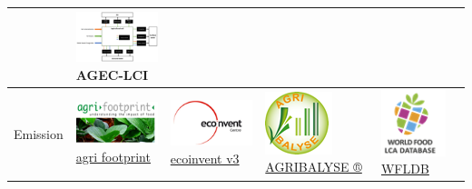 \documentclass[openany]{book}
\begin{document}
\begin{longtable}[]{@{}llllll@{}}
\begin{minipage}[b]{0.12\columnwidth}
\end{minipage} & \begin{minipage}[b]{0.17\columnwidth}\raggedright
\includegraphics{Figures/agec_lci_logo.png} AGEC-LCI\strut
\end{minipage}\tabularnewline
\midrule
\endfirsthead
\toprule
\begin{minipage}[b]{0.12\columnwidth}\raggedright
Emission\strut
\end{minipage} & \begin{minipage}[b]{0.16\columnwidth}\raggedright
\includegraphics{Figures/agri-footprint.png} \href{https://www.agri-footprint.com/}{agri footprint} \citep{durlinger2017}\strut
\end{minipage} & \begin{minipage}[b]{0.12\columnwidth}\raggedright
\includegraphics{Figures/ecoinvent.png} \href{https://www.ecoinvent.org/}{ecoinvent v3} \citep{nemecek2011}\strut
\end{minipage} & \begin{minipage}[b]{0.13\columnwidth}\raggedright
\includegraphics{Figures/agribalyse.png} \href{https://www.ademe.fr/en/expertise/alternative-approaches-to-production/agribalyse-program}{AGRIBALYSE ®} \citep{Koch2015}\strut
\end{minipage} & \begin{minipage}[b]{0.12\columnwidth}\raggedright
\includegraphics{Figures/WFLDB.png} \href{https://quantis-intl.com/tools/databases/wfldb-food/}{WFLDB} \citep{nemecek2014}\strut

\end{minipage}
\end{longtable}
\end{document}
